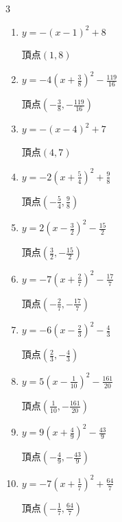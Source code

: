\begin{multicols}{3}
\begin{enumerate}
        $\displaystyle 頂点\left( -\frac{4}{3} , \frac{4}{3} \right)$

  \item $\displaystyle y=-\left( x-1\right)^{2}+8$

        $\displaystyle 頂点\left( 1 , 8 \right)$

  \item $\displaystyle y=-4\left( x+\frac{3}{8}\right)^{2}-\frac{119}{16}$

        $\displaystyle 頂点\left( -\frac{3}{8} , -\frac{119}{16} \right)$

  \item $\displaystyle y=-\left( x-4\right)^{2}+7$

        $\displaystyle 頂点\left( 4 , 7 \right)$

  \item $\displaystyle y=-2\left( x+\frac{5}{4}\right)^{2}+\frac{9}{8}$

        $\displaystyle 頂点\left( -\frac{5}{4} , \frac{9}{8} \right)$

  \item $\displaystyle y=2\left( x-\frac{3}{2}\right)^{2}-\frac{15}{2}$

        $\displaystyle 頂点\left( \frac{3}{2} , -\frac{15}{2} \right)$

  \item $\displaystyle y=-7\left( x+\frac{2}{7}\right)^{2}-\frac{17}{7}$

        $\displaystyle 頂点\left( -\frac{2}{7} , -\frac{17}{7} \right)$

  \item $\displaystyle y=-6\left( x-\frac{2}{3}\right)^{2}-\frac{4}{3}$

        $\displaystyle 頂点\left( \frac{2}{3} , -\frac{4}{3} \right)$

  \item $\displaystyle y=5\left( x-\frac{1}{10}\right)^{2}-\frac{161}{20}$

        $\displaystyle 頂点\left( \frac{1}{10} , -\frac{161}{20} \right)$

  \item $\displaystyle y=9\left( x+\frac{4}{9}\right)^{2}-\frac{43}{9}$

        $\displaystyle 頂点\left( -\frac{4}{9} , -\frac{43}{9} \right)$

  \item $\displaystyle y=-7\left( x+\frac{1}{7}\right)^{2}+\frac{64}{7}$

        $\displaystyle 頂点\left( -\frac{1}{7} , \frac{64}{7} \right)$


\end{enumerate}
\end{multicols}
